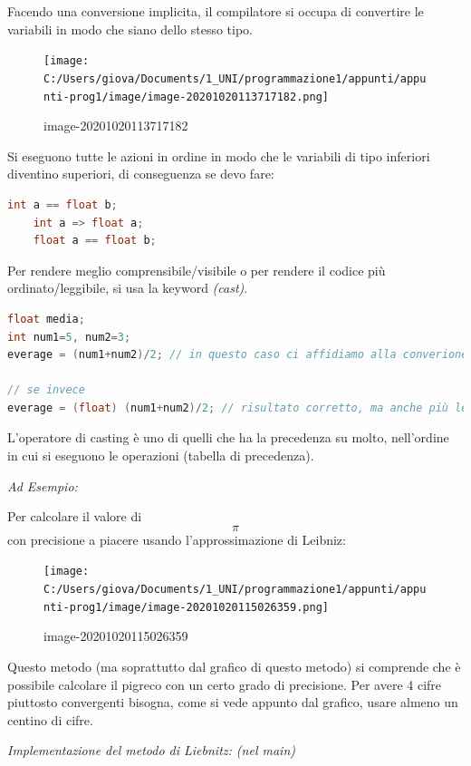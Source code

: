 \documentclass[
  paper=a4,
  oneside  ,captions=tableheading
]{scrbook}
\begin{document}
Facendo una conversione implicita, il compilatore si occupa di
convertire le variabili in modo che siano dello stesso tipo.

\begin{figure}
\centering
\texttt{[image: C:/Users/giova/Documents/1\_UNI/programmazione1/appunti/appunti-prog1/image/image-20201020113717182.png]}
\caption{image-20201020113717182}
\end{figure}

Si eseguono tutte le azioni in ordine in modo che le variabili di tipo
inferiori diventino superiori, di conseguenza se devo fare:

\begin{lstlisting}[language=C]
int a == float b; 
    int a => float a;
    float a == float b;
\end{lstlisting}

Per rendere meglio comprensibile/visibile o per rendere il codice più
ordinato/leggibile, si usa la keyword \emph{(cast)}.

\begin{lstlisting}[language=C]
float media;
int num1=5, num2=3;
everage = (num1+num2)/2; // in questo caso ci affidiamo alla converione implicita, il valore mancherà di cifre decimali

// se invece 
everage = (float) (num1+num2)/2; // risultato corretto, ma anche più leggibile.
\end{lstlisting}

L'operatore di casting è uno di quelli che ha la precedenza su molto,
nell'ordine in cui si eseguono le operazioni (tabella di precedenza).

\emph{Ad Esempio:}

Per calcolare il valore di \[
\pi
\] con precisione a piacere usando l'approssimazione di Leibniz:

\begin{figure}
\centering
\texttt{[image: C:/Users/giova/Documents/1\_UNI/programmazione1/appunti/appunti-prog1/image/image-20201020115026359.png]}
\caption{image-20201020115026359}
\end{figure}

Questo metodo (ma soprattutto dal grafico di questo metodo) si comprende
che è possibile calcolare il pigreco con un certo grado di precisione.
Per avere 4 cifre piuttosto convergenti bisogna, come si vede appunto
dal grafico, usare almeno un centino di cifre.

\emph{Implementazione del metodo di Liebnitz: (nel main)}
\end{document}
